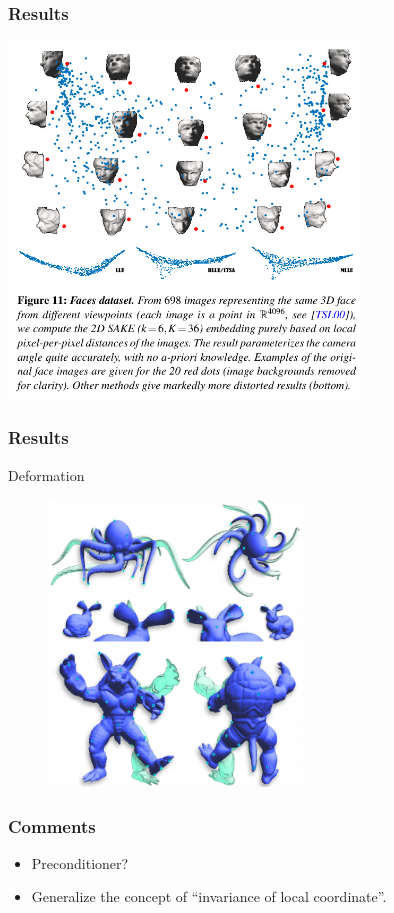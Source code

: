 \documentclass[serif,mathserif, 12pt]{beamer}
\begin{document}
\begin{frame}
  \frametitle{Results}
  \centering
  \includegraphics[width=0.7\textwidth]{img/faces_data}
\end{frame}

\begin{frame}
  \frametitle{Results}
  Deformation
  \begin{figure}
    \centering
    \includegraphics[width=0.6\textwidth]{img/sake_deformation}
  \end{figure}
\end{frame}

\begin{frame}
  \frametitle{Comments}
  \begin{itemize}
  \item Preconditioner?
  \item Generalize the concept of ``invariance of local coordinate''.
  \end{itemize}
\end{frame}

\begin{frame} 
\end{frame}
\end{document}
